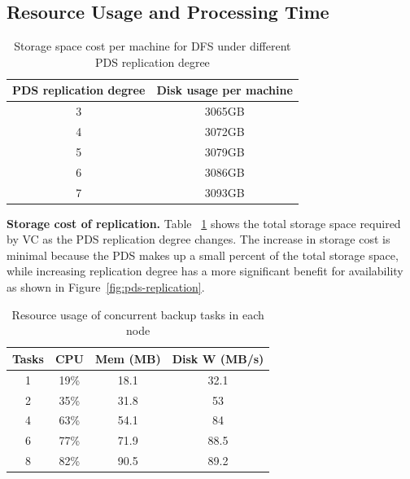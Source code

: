 \subsection{Resource Usage and Processing Time}
\begin{table}
    \begin{tabular}{|c|c|}
    \hline
    PDS replication degree & Disk usage per machine  \\ \hline
    3                      & 3065GB             \\ \hline
    4                      & 3072GB             \\ \hline
    5                      & 3079GB             \\ \hline
    6                      & 3086GB             \\ \hline
    7                      & 3093GB             \\ \hline
    \end{tabular}
\caption{Storage space cost per machine for DFS under different PDS replication degree}
\label{tab:replication_cost}
\end{table}

{\bf Storage cost of replication.} Table ~\ref{tab:replication_cost} shows the total storage space required by 
VC as the PDS replication degree changes. The increase in storage cost is minimal because the PDS makes up a 
small percent of the total storage space, while increasing replication degree has a  more significant benefit for
availability as shown in Figure~\ref{fig:pds-replication}.

\begin{table}
    \begin{tabular}{|c|c|c|c|}
    \hline
    Tasks & CPU & Mem (MB) & Disk W (MB/s) \\ \hline
    1     & 19\% & 18.1 & 32.1 \\ \hline
    2     & 35\% & 31.8 & 53 \\ \hline
    4     & 63\% & 54.1 & 84 \\ \hline
    6     & 77\% & 71.9 & 88.5 \\ \hline
    8     & 82\% & 90.5 & 89.2 \\ \hline
    \end{tabular}
\caption{Resource usage of concurrent backup tasks in each node}
\label{tab:resource_usage}
\end{table}

